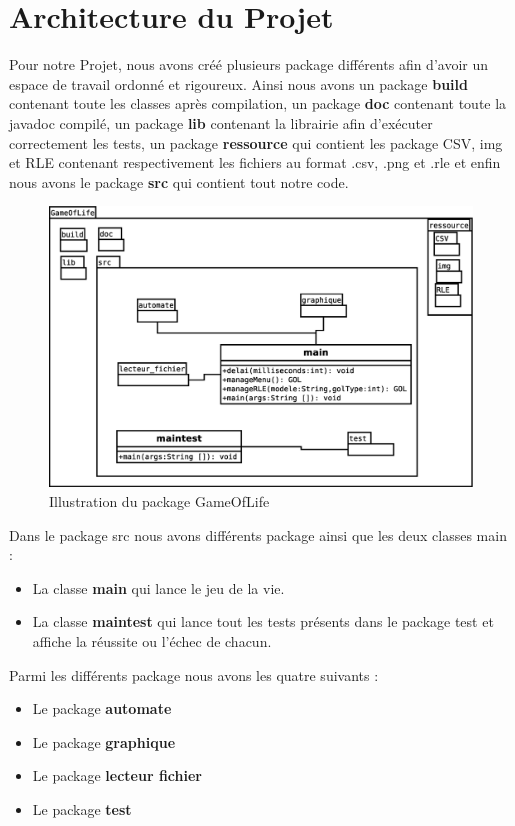\section{Architecture du Projet}
Pour notre Projet, nous avons créé plusieurs package différents afin d'avoir un espace de travail ordonné et rigoureux.
Ainsi nous avons un package \textbf{build} contenant toute les classes après compilation, un package \textbf{doc} contenant toute la javadoc compilé, un package \textbf{lib} contenant la librairie afin d'exécuter correctement les tests, un package \textbf{ressource} qui contient les package CSV, img et RLE contenant respectivement les fichiers au format .csv, .png et .rle et enfin nous avons le package \textbf{src} qui contient tout notre code. 
\begin{figure}[htp]
\centering
\includegraphics[scale=0.35]{images/Diagramme/Projet.eps}
\caption{\label{fig:GameOfLife}Illustration du package GameOfLife}
\end{figure}

\par Dans le package src nous avons différents package ainsi que les deux classes main : \begin{itemize}
    \item La classe \textbf{main} qui lance le jeu de la vie.
    \item La classe \textbf{maintest} qui lance tout les tests présents dans le package test et affiche la réussite ou l'échec de chacun.
\end{itemize}
\par Parmi les différents package nous avons les quatre suivants : \begin{itemize}
    \item Le package \textbf{automate}
    \item Le package \textbf{graphique}
    \item Le package \textbf{lecteur fichier}
    \item Le package \textbf{test}
\end{itemize}
